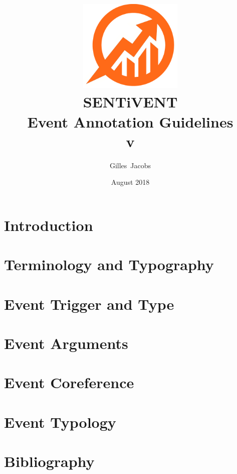 \documentclass[a4paper]{report}
\title{
    \includegraphics[width=5cm]{img/semalyticslogonotext.png}\\
    [10pt]{\huge\bfseries {\Huge S{\huge ENT}i{\huge VENT}}\\
    Event Annotation Guidelines\\
    v\vhCurrentVersion\\
    \Large{\normalfont{Technical Report}}
    }
}
\author{Gilles~Jacobs}
\date{August 2018}
\begin{document}
\maketitle
\tableofcontents
\newpage


\label{chapter/rev}

\chapter{Introduction}
\label{chapter/intro}


\chapter{Terminology and Typography}
\label{chapter/conventions}


\chapter{Event Trigger and Type}
\label{chapter/events}


\chapter{Event Arguments}
\label{chapter/arguments}


\chapter{Event Coreference}
\label{chapter/coref}


\chapter{Event Typology}
\label{chapter/eventtype}


\chapter{Bibliography}
\label{chapter/bibliography}


\end{document}
